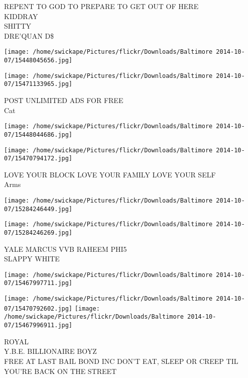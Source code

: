 \documentclass[10pt,letterpaper]{article}
\begin{document}
REPENT TO GOD TO PREPARE TO GET OUT OF HERE\\
KIDDRAY\\
SHITTY\\
DRE'QUAN D\$\\
\pagebreak

\texttt{[image: /home/swickape/Pictures/flickr/Downloads/Baltimore 2014-10-07/15448045656.jpg]}

\vspace{0.25in}
\texttt{[image: /home/swickape/Pictures/flickr/Downloads/Baltimore 2014-10-07/15471133965.jpg]}

POST UNLIMITED ADS FOR FREE\\
Cat\\
\pagebreak

\texttt{[image: /home/swickape/Pictures/flickr/Downloads/Baltimore 2014-10-07/15448044686.jpg]}

\vspace{0.25in}
\texttt{[image: /home/swickape/Pictures/flickr/Downloads/Baltimore 2014-10-07/15470794172.jpg]}

LOVE YOUR BLOCK LOVE YOUR FAMILY LOVE YOUR SELF\\
Arms\\
\pagebreak

\texttt{[image: /home/swickape/Pictures/flickr/Downloads/Baltimore 2014-10-07/15284246449.jpg]}

\vspace{0.25in}
\texttt{[image: /home/swickape/Pictures/flickr/Downloads/Baltimore 2014-10-07/15284246269.jpg]}

YALE MARCUS VVB RAHEEM PHI5\\
SLAPPY WHITE\\
\pagebreak

\texttt{[image: /home/swickape/Pictures/flickr/Downloads/Baltimore 2014-10-07/15467997711.jpg]}

\vspace{0.25in}
\texttt{[image: /home/swickape/Pictures/flickr/Downloads/Baltimore 2014-10-07/15470792602.jpg]}
\texttt{[image: /home/swickape/Pictures/flickr/Downloads/Baltimore 2014-10-07/15467996911.jpg]}

ROYAL\\
Y.B.E. BILLIONAIRE BOYZ\\
FREE AT LAST BAIL BOND INC DON'T EAT, SLEEP OR CREEP TIL YOU'RE BACK ON THE STREET\\
\pagebreak
\end{document}
